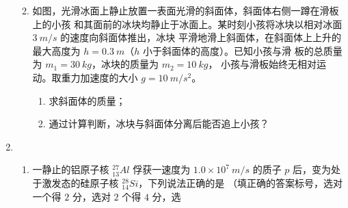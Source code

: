\begin{enumerate}
\begin{enumerate}

\item 
如图，光滑冰面上静止放置一表面光滑的斜面体，斜面体右侧一蹲在滑板上的小孩
和其面前的冰块均静止于冰面上。某时刻小孩将冰块以相对冰面 $ 3 \ m /s $ 的速度向斜面体推出，冰块
平滑地滑上斜面体，在斜面体上上升的最大高度为 $ h=0.3 \ m $（$ h $ 小于斜面体的高度）。已知小孩与滑
板的总质量为 $ m_{1} =30 \ kg $，冰块的质量为 $ m_{2} =10 \ kg $，
小孩与滑板始终无相对运动。取重力加速度的大小 $ g=10 \ m/s^{2} $。
\begin{enumerate}
	\item
求斜面体的质量；
\item 
通过计算判断，冰块与斜面体分离后能否追上小孩？
	
\end{enumerate}
\begin{figure}[h!]
	\flushright
	
\end{figure}




	
\end{enumerate}


\item 
{}
\begin{enumerate}
	\item
一静止的铝原子核 $ ^{27}_{13}A l $ 俘获一速度为 $ 1.0 \times10^{7} \ m /s $ 的质子 $ p $ 后，变为处于激发态的硅原子核
$ ^{28}_{14}Si $，下列说法正确的是 \underlinegap （填正确的答案标号，选对一个得 $ 2 $ 分，选对 $ 2 $ 个得 $ 4 $ 分，选


\end{enumerate}
\end{enumerate}
